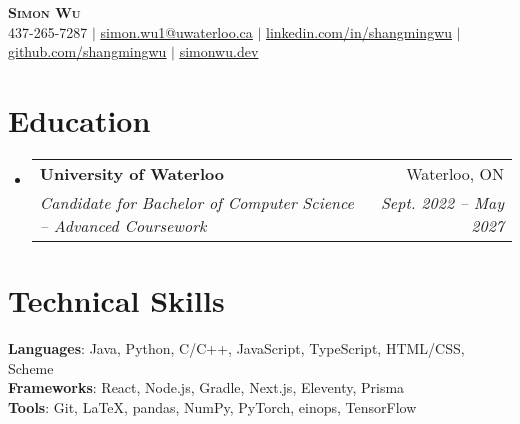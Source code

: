 \documentclass[letterpaper,11pt]{article}
\makeatletter
\newcommand{\resumeSubheading}[4]{
  \vspace{-2pt}\item
    \begin{tabular*}{0.97\textwidth}[t]{l@{\extracolsep{\fill}}r}
      \textbf{#1} & #2 \\
      \textit{\small#3} & \textit{\small #4} \\
    \end{tabular*}\vspace{-7pt}
}
\newcommand{\resumeSubHeadingListStart}{\begin{itemize}[leftmargin=0.15in, label={}]}
\newcommand{\resumeSubHeadingListEnd}{\end{itemize}}
\makeatother
\begin{document}

\begin{center}
    \textbf{\Huge \scshape Simon Wu} \\ \vspace{1pt}
    \small 437-265-7287 $|$ \href{mailto:simon.wu1@uwaterloo.ca}{\underline{simon.wu1@uwaterloo.ca}} $|$ 
    \href{https://www.linkedin.com/in/simon-wu-53636a243}{\underline{linkedin.com/in/shangmingwu}} $|$
    \href{https://github.com/shangmingwu}{\underline{github.com/shangmingwu}} $|$
    \href{https://simonwu.dev}{\underline{simonwu.dev}}
\end{center}


\section{Education}
  \resumeSubHeadingListStart
    \resumeSubheading
      {University of Waterloo}{Waterloo, ON}
      {Candidate for Bachelor of Computer Science -- Advanced Coursework}{Sept. 2022 -- May 2027}
  \resumeSubHeadingListEnd


\section{Technical Skills}
 \begin{itemize}[leftmargin=0.15in, label={}]
    \small{\item{
     \textbf{Languages}{: Java, Python, C/C++, JavaScript, TypeScript, HTML/CSS, Scheme } \\
     \textbf{Frameworks}{: React, Node.js, Gradle, Next.js, Eleventy, Prisma } \\
     \textbf{Tools}{: Git, \LaTeX, pandas, NumPy, PyTorch, einops, TensorFlow}
    }}
 \end{itemize}
\end{document}
